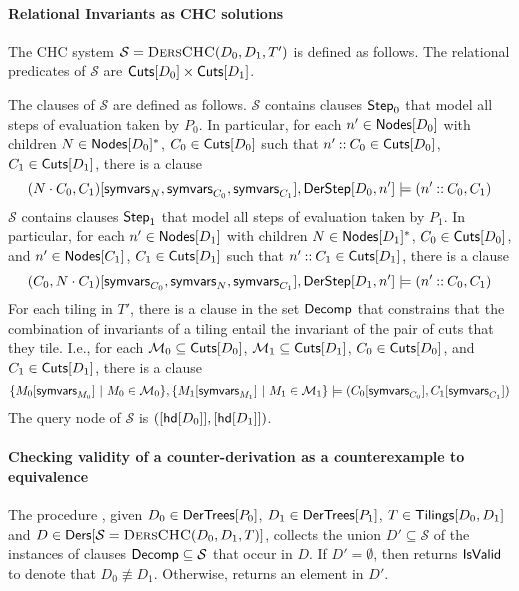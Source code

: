 \paragraph{Relational Invariants as CHC solutions}
The CHC system $\mathcal{S} = \textsc{DersCHC}(D_0, D_1, T')$ is defined as
follows.
The relational predicates of $\mathcal{S}$ are $\mathsf{Cuts}[ D_0 ] \times
\mathsf{Cuts}[ D_1 ]$.

The clauses of $\mathcal{S}$ are defined as follows.
%
$\mathcal{S}$ contains clauses $\mathsf{Step}_0$ that model all steps
of evaluation taken by $P_0$.
%
In particular, for each $n' \in \mathsf{Nodes}[ D_0 ]$ with children $N \in
\mathsf{Nodes}[ D_0 ]^{*}$, %
$C_0 \in \mathsf{Cuts}[ D_0 ]$ such that $n' \mathbin{::} C_0 \in \mathsf{Cuts}[ D_0 ]$,
$C_1 \in \mathsf{Cuts}[ D_1 ]$, there is a clause %
\[ (N \concat C_0, C_1)[ \symvars{N}, \symvars{C_0}, \symvars{C_1} ], %
\derstep{D_0}{ n' } \entails %
(n' \cons C_0, C_1) \]
%
%
$\mathcal{S}$ contains clauses $\mathsf{Step}_1$ that model all steps
of evaluation taken by $P_1$.
%
In particular, for each $n' \in \mathsf{Nodes}[ D_1 ]$ with children $N \in
\mathsf{Nodes}[ D_1 ]^{*}$, %
$C_0 \in \mathsf{Cuts}[ D_0 ]$, and %
$n' \in \mathsf{Nodes}[ C_1 ]$, %
$C_1 \in \mathsf{Cuts}[ D_1 ]$ such that $n' \mathbin{::} C_1 \in \mathsf{Cuts}[ D_1 ]$, %
there is a clause %
\[ (C_0, N \concat C_1)[ \symvars{C_0}, \symvars{N}, \symvars{C_1} ], %
\derstep{D_1}{ n' } \entails %
(n' \cons C_0, C_1) \]
%
For each tiling in $T'$, there is a clause in the set $\mathsf{Decomp}$
that constrains that the combination of invariants of a tiling entail
the invariant of the pair of cuts that they tile.
%
I.e., for each $\mathcal{M}_0 \subseteq \mathsf{Cuts}[ D_0 ]$, %
$\mathcal{M}_1 \subseteq \mathsf{Cuts}[ D_1 ]$, %
$C_0 \in \mathsf{Cuts}[ D_0 ]$, and %
$C_1 \in \mathsf{Cuts}[ D_1 ]$, there is a clause
%
\[ \setformer{ M_0[ \symvars{ M_0 } ]}{ M_0 \in \mathcal{M}_0 }, %
\setformer{ M_1[ \symvars{ M_1 } ] }{ M_1 \in \mathcal{M}_1 } \entails %
(C_0[ \symvars{C_0} ], C_1[ \symvars{C_1} ])
\]
%
The query node of $\mathcal{S}$ is $( [ \mathsf{hd}[ D_0 ] ], [ \mathsf{hd}[ D_1 ]
])$.
%

\paragraph{Checking validity of a counter-derivation as a
  counterexample to equivalence}
%
The procedure \isvalidcex, given $D_0 \in \mathsf{DerTrees}[ P_0 ]$, $D_1 \in
\mathsf{DerTrees}[ P_1 ]$, $T \in \mathsf{Tilings}[ D_0, D_1 ]$ and $D \in \mathsf{Ders}[ 
  \mathcal{S} = \textsc{DersCHC}(D_0, D_1, T) ]$, collects the union $D'
\subseteq \mathcal{S}$ of the instances
%
%
of clauses $\mathsf{Decomp} \subseteq \mathcal{S}$ that occur in $D$.
%
If $D' = \emptyset$, then \isvalidcex returns $\mathsf{IsValid}$ to denote
that $D_0 \not\equiv D_1$.
%
Otherwise, \isvalidcex returns an element in $D'$.

